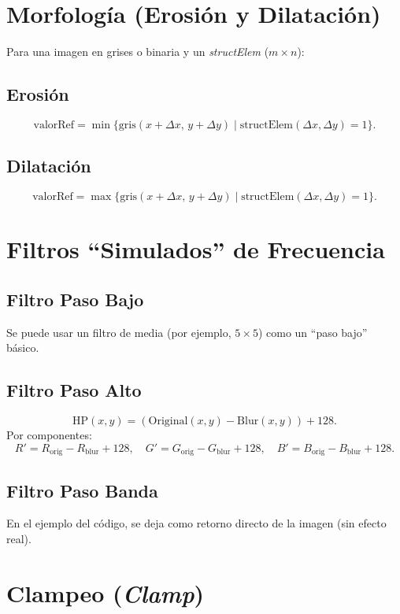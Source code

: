 \documentclass[11pt]{article}
\begin{document}
\section{Morfología (Erosión y Dilatación)}

Para una imagen en grises o binaria y un \textit{structElem} (\(m \times n\)):

\subsection{Erosión}
\[
\text{valorRef} = \min \{ \text{gris}(x + \Delta x,\, y + \Delta y) \mid \text{structElem}(\Delta x,\Delta y) = 1\}.
\]

\subsection{Dilatación}
\[
\text{valorRef} = \max \{ \text{gris}(x + \Delta x,\, y + \Delta y) \mid \text{structElem}(\Delta x,\Delta y) = 1\}.
\]

\section{Filtros ``Simulados'' de Frecuencia}

\subsection{Filtro Paso Bajo}
Se puede usar un filtro de media (por ejemplo, \(5 \times 5\)) como un “paso bajo” básico.

\subsection{Filtro Paso Alto}
\[
\text{HP}(x,y) = (\text{Original}(x,y) - \text{Blur}(x,y)) + 128.
\]
Por componentes:
\[
R' = R_{\text{orig}} - R_{\text{blur}} + 128, \quad
G' = G_{\text{orig}} - G_{\text{blur}} + 128, \quad
B' = B_{\text{orig}} - B_{\text{blur}} + 128.
\]

\subsection{Filtro Paso Banda}
En el ejemplo del código, se deja como retorno directo de la imagen (sin efecto real).

\section{Clampeo (\textit{Clamp})}
\end{document}
